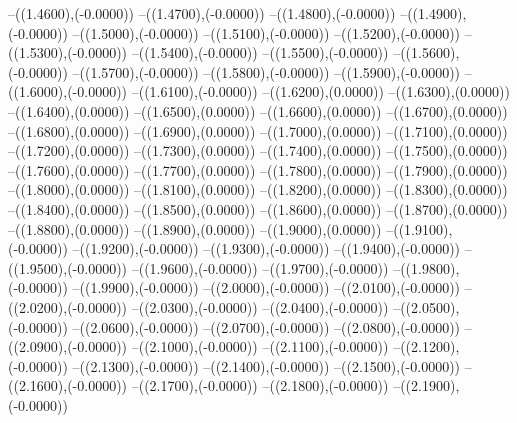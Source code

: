 {	--({\sx*(1.4600)},{\sy*(-0.0000)})
	--({\sx*(1.4700)},{\sy*(-0.0000)})
	--({\sx*(1.4800)},{\sy*(-0.0000)})
	--({\sx*(1.4900)},{\sy*(-0.0000)})
	--({\sx*(1.5000)},{\sy*(-0.0000)})
	--({\sx*(1.5100)},{\sy*(-0.0000)})
	--({\sx*(1.5200)},{\sy*(-0.0000)})
	--({\sx*(1.5300)},{\sy*(-0.0000)})
	--({\sx*(1.5400)},{\sy*(-0.0000)})
	--({\sx*(1.5500)},{\sy*(-0.0000)})
	--({\sx*(1.5600)},{\sy*(-0.0000)})
	--({\sx*(1.5700)},{\sy*(-0.0000)})
	--({\sx*(1.5800)},{\sy*(-0.0000)})
	--({\sx*(1.5900)},{\sy*(-0.0000)})
	--({\sx*(1.6000)},{\sy*(-0.0000)})
	--({\sx*(1.6100)},{\sy*(-0.0000)})
	--({\sx*(1.6200)},{\sy*(0.0000)})
	--({\sx*(1.6300)},{\sy*(0.0000)})
	--({\sx*(1.6400)},{\sy*(0.0000)})
	--({\sx*(1.6500)},{\sy*(0.0000)})
	--({\sx*(1.6600)},{\sy*(0.0000)})
	--({\sx*(1.6700)},{\sy*(0.0000)})
	--({\sx*(1.6800)},{\sy*(0.0000)})
	--({\sx*(1.6900)},{\sy*(0.0000)})
	--({\sx*(1.7000)},{\sy*(0.0000)})
	--({\sx*(1.7100)},{\sy*(0.0000)})
	--({\sx*(1.7200)},{\sy*(0.0000)})
	--({\sx*(1.7300)},{\sy*(0.0000)})
	--({\sx*(1.7400)},{\sy*(0.0000)})
	--({\sx*(1.7500)},{\sy*(0.0000)})
	--({\sx*(1.7600)},{\sy*(0.0000)})
	--({\sx*(1.7700)},{\sy*(0.0000)})
	--({\sx*(1.7800)},{\sy*(0.0000)})
	--({\sx*(1.7900)},{\sy*(0.0000)})
	--({\sx*(1.8000)},{\sy*(0.0000)})
	--({\sx*(1.8100)},{\sy*(0.0000)})
	--({\sx*(1.8200)},{\sy*(0.0000)})
	--({\sx*(1.8300)},{\sy*(0.0000)})
	--({\sx*(1.8400)},{\sy*(0.0000)})
	--({\sx*(1.8500)},{\sy*(0.0000)})
	--({\sx*(1.8600)},{\sy*(0.0000)})
	--({\sx*(1.8700)},{\sy*(0.0000)})
	--({\sx*(1.8800)},{\sy*(0.0000)})
	--({\sx*(1.8900)},{\sy*(0.0000)})
	--({\sx*(1.9000)},{\sy*(0.0000)})
	--({\sx*(1.9100)},{\sy*(-0.0000)})
	--({\sx*(1.9200)},{\sy*(-0.0000)})
	--({\sx*(1.9300)},{\sy*(-0.0000)})
	--({\sx*(1.9400)},{\sy*(-0.0000)})
	--({\sx*(1.9500)},{\sy*(-0.0000)})
	--({\sx*(1.9600)},{\sy*(-0.0000)})
	--({\sx*(1.9700)},{\sy*(-0.0000)})
	--({\sx*(1.9800)},{\sy*(-0.0000)})
	--({\sx*(1.9900)},{\sy*(-0.0000)})
	--({\sx*(2.0000)},{\sy*(-0.0000)})
	--({\sx*(2.0100)},{\sy*(-0.0000)})
	--({\sx*(2.0200)},{\sy*(-0.0000)})
	--({\sx*(2.0300)},{\sy*(-0.0000)})
	--({\sx*(2.0400)},{\sy*(-0.0000)})
	--({\sx*(2.0500)},{\sy*(-0.0000)})
	--({\sx*(2.0600)},{\sy*(-0.0000)})
	--({\sx*(2.0700)},{\sy*(-0.0000)})
	--({\sx*(2.0800)},{\sy*(-0.0000)})
	--({\sx*(2.0900)},{\sy*(-0.0000)})
	--({\sx*(2.1000)},{\sy*(-0.0000)})
	--({\sx*(2.1100)},{\sy*(-0.0000)})
	--({\sx*(2.1200)},{\sy*(-0.0000)})
	--({\sx*(2.1300)},{\sy*(-0.0000)})
	--({\sx*(2.1400)},{\sy*(-0.0000)})
	--({\sx*(2.1500)},{\sy*(-0.0000)})
	--({\sx*(2.1600)},{\sy*(-0.0000)})
	--({\sx*(2.1700)},{\sy*(-0.0000)})
	--({\sx*(2.1800)},{\sy*(-0.0000)})
	--({\sx*(2.1900)},{\sy*(-0.0000)})
}
